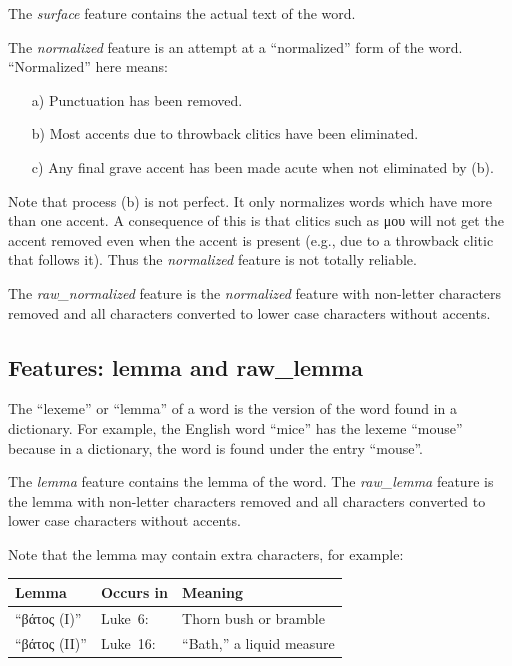 \documentclass[11pt,oneside,a4paper]{memoir}
\newcommand*{\bibleref}[3]{#1~#2\thinspace:\thinspace#3}
\begin{document}
The \emph{surface} feature contains the actual text of the word.

The \emph{normalized} feature is an attempt at a ``normalized'' form of the word. ``Normalized''
here means:

\begin{itemize}
\item[a)] Punctuation has been removed.
\item[b)] Most accents due to throwback clitics have been eliminated.
\item[c)] Any final grave accent has been made acute when not eliminated by (b).
\end{itemize}

Note that process (b) is not perfect. It only normalizes words which have more than one accent. A
consequence of this is that clitics such as μου will not get the accent removed even when the accent
is present (e.g., due to a throwback clitic that follows it). Thus the \emph{normalized} feature is
not totally reliable.

The \emph{raw\_normalized} feature is the \emph{normalized} feature with non-letter characters
removed and all characters converted to lower case characters without accents.


\subsection{Features: lemma and raw\_lemma}

The ``lexeme'' or ``lemma'' of a word is the version of the word found in a dictionary. For example,
the English word ``mice'' has the lexeme ``mouse'' because in a dictionary, the word is found under
the entry ``mouse''.

The \emph{lemma} feature contains the lemma of the word. The \emph{raw\_lemma} feature is the lemma
with non-letter characters removed and all characters converted to lower case characters without
accents.

Note that the lemma may contain extra characters, for example:

\begin{center}
  \begin{tabular}{lll}
    \textbf{Lemma} & \textbf{Occurs in} & \textbf{Meaning}\\
    \hline
    ``βάτος (I)''  & \bibleref{Luke}{6}{44} & Thorn bush or bramble\\
    ``βάτος (II)'' & \bibleref{Luke}{16}{6} & ``Bath,'' a liquid measure\\
  \end{tabular}
\end{center}
\end{document}
